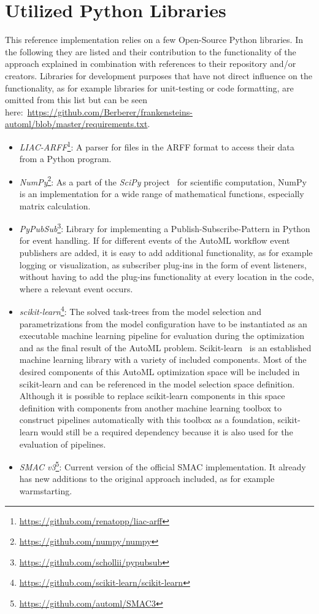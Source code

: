 \section{Utilized Python Libraries}
\label{sec:implementation:libraries}
This reference implementation relies on a few Open-Source Python libraries.
In the following they are listed and their contribution to the functionality of the approach explained in combination with references to their repository and/or creators.
Libraries for development purposes that have not direct influence on the functionality, as for example libraries for unit-testing or code formatting, are omitted from this list but can be seen here:~\url{https://github.com/Berberer/frankensteins-automl/blob/master/requirements.txt}. 
\begin{itemize}
    \item \textit{LIAC-ARFF}\footnote{\url{https://github.com/renatopp/liac-arff}}: A parser for files in the ARFF format to access their data from a Python program.
    \item \textit{NumPy}\footnote{\url{https://github.com/numpy/numpy}}: As a part of the \textit{SciPy} project~\cite{Virtanen-SciPy} for scientific computation, NumPy is an implementation for a wide range of mathematical functions, especially matrix calculation.
    \item \textit{PyPubSub}\footnote{\url{https://github.com/schollii/pypubsub}}: Library for implementing a Publish-Subscribe-Pattern in Python for event handling.
    If for different events of the AutoML workflow event publishers are added, it is easy to add additional functionality, as for example logging or visualization, as subscriber plug-ins in the form of event listeners, without having to add the plug-ins functionality at every location in the code, where a relevant event occurs.
    \item \textit{scikit-learn}\footnote{\url{https://github.com/scikit-learn/scikit-learn}}: The solved task-trees from the model selection and parametrizations from the model configuration have to be instantiated as an executable machine learning pipeline for evaluation during the optimization and as the final result of the AutoML problem.
    Scikit-learn~\cite{Pedregosa-Scikit-learn} is an established machine learning library with a variety of included components.
    Most of the desired components of this AutoML optimization space will be included in scikit-learn and can be referenced in the model selection space definition.
    Although it is possible to replace scikit-learn components in this space definition with components from another machine learning toolbox to construct pipelines automatically with this toolbox as a foundation, scikit-learn would still be a required dependency because it is also used for the evaluation of pipelines.
    \item \textit{SMAC v3}\footnote{\url{https://github.com/automl/SMAC3}}: Current version of the official SMAC implementation. It already has new additions to the original approach included, as for example warmstarting.
\end{itemize}

